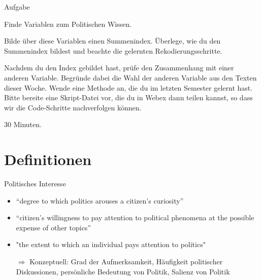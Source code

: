 \documentclass[11pt]{beamer}
\begin{document}
\begin{frame}{Aufgabe}

	\begin{nolist}
		\item Finde Variablen zum Politischen Wissen. 
		\item Bilde über diese Variablen einen Summenindex. Überlege, wie du den Summenindex bildest und beachte die gelernten Rekodierungsschritte.
		\item Nachdem du den Index gebildet hast, prüfe den Zusammenhang mit einer anderen Variable. Begründe dabei die Wahl der anderen Variable aus den Texten dieser Woche. Wende eine Methode an, die du im letzten Semester gelernt hast. 
Bitte bereite eine Skript-Datei vor, die du in Webex dann teilen kannst, so dass wir die Code-Schritte nachverfolgen können.
	\end{nolist}

 30 Minuten.
\end{frame}

\section{Definitionen}


\begin{frame}[t]{Politisches Interesse}
			\begin{itemize}
				\item “degree to which politics arouses a citizen’s curiosity” \parencite[278]{vanDeth1990}
				\item “citizen’s willingness to pay attention to political phenomena at the possible expense of other topics” \parencite[1122]{Lupia2005}
				\item "the extent to which an individual pays attention to politics" \parencite[21]{Zaller1992}
				\item[$\Rightarrow$] Konzeptuell: Grad der Aufmerksamkeit, Häufigkeit politischer Diskussionen, persönliche Bedeutung von Politik, Salienz von Politik
			\end{itemize}
		\end{frame}

\end{document}
